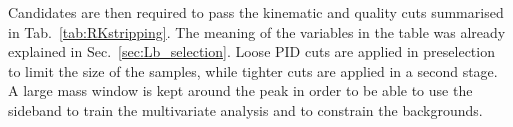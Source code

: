 Candidates are then required to pass the kinematic and quality cuts summarised in Tab.~\ref{tab:RKstripping}. 
The meaning of the variables in the table was already explained in Sec.~\ref{sec:Lb_selection}.
Loose PID cuts are applied in preselection to limit the size of the samples, while tighter cuts are applied
in a second stage. A large mass window is kept around the \Bz peak in order to be able
to use the sideband to train the multivariate analysis and to constrain the backgrounds.
%
%
